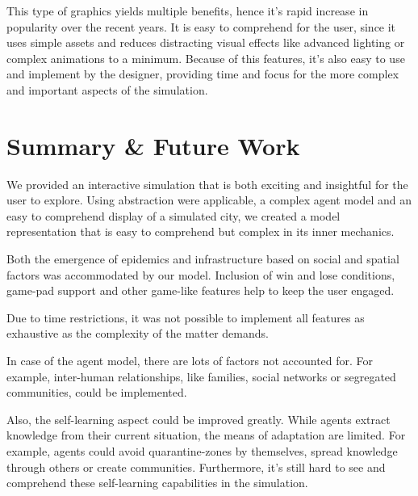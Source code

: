 \documentclass[table]{sig-alternate-05-2015}
\begin{document}
This type of graphics yields multiple benefits, hence it's rapid increase in popularity over the recent years. It is easy to comprehend for the user, since it uses simple assets and reduces distracting visual effects like advanced lighting or complex animations to a minimum. Because of this features, it's also easy to use and implement by the designer, providing time and focus for the more complex and important aspects of the simulation.

\newpage

\section{Summary \& Future Work}

We provided an interactive simulation that is both exciting and insightful for the user to explore. Using abstraction were applicable, a complex agent model and an easy to comprehend display of a simulated city, we created a model representation that is easy to comprehend but complex in its inner mechanics.

Both the emergence of epidemics and infrastructure based on social and spatial factors was accommodated by our model. Inclusion of win and lose conditions, game-pad support and other game-like features help to keep the user engaged.

Due to time restrictions, it was not possible to implement all features as exhaustive as the complexity of the matter demands.

In case of the agent model, there are lots of factors not accounted for. For example, inter-human relationships, like families, social networks or segregated communities, could be implemented.

Also, the self-learning aspect could be improved greatly. While agents extract knowledge from their current situation, the means of adaptation are limited. For example, agents could avoid quarantine-zones by themselves, spread knowledge through others or create communities. Furthermore, it's still hard to see and comprehend these self-learning capabilities in the simulation.
\end{document}

